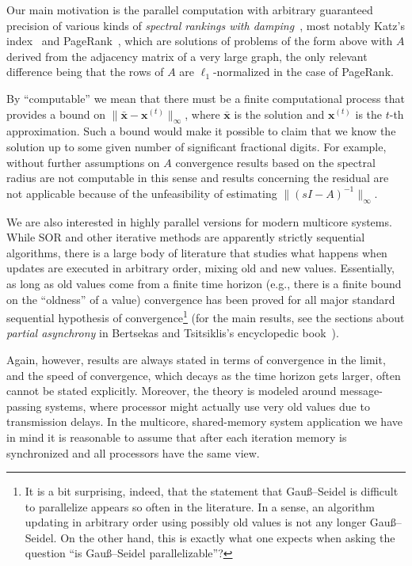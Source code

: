 \documentclass{article}
\newcommand{\Gauss}{Gau\ss}
\newcommand{\1}{\mathbf 1}
\begin{document}
Our main motivation is the parallel computation with arbitrary guaranteed
precision of various kinds of \emph{spectral rankings with
damping}~\cite{VigSR}, most notably Katz's index~\cite{KatNSIDSA} and
PageRank~\cite{PBMPCR}, which are solutions of problems of the form above with
$A$ derived from the adjacency matrix of a very large graph, the only relevant
difference being that the rows of $A$ are $\ell_1$-normalized in the case of PageRank.

By ``computable'' we mean that there must be a finite computational process that
provides a bound on $\bigl\|\bar{\bm x}-\bm x^{(t)}\bigr\|_\infty$,
where $\bar{\bm x}$ is the solution and $\bm x^{(t)}$ is the $t$-th
approximation. Such a bound would make it possible to claim that we
know the solution up to some given number of significant fractional digits. For
example, without further assumptions on $A$ convergence results based on the
spectral radius are not computable in this sense and results concerning the
residual are not applicable because of the unfeasibility of estimating
$\bigl\|(sI-A)^{-1}\bigr\|_\infty$. 

We are also interested in highly parallel versions for modern multicore systems.
While SOR and other iterative methods are apparently strictly sequential
algorithms, there is a large body of literature that studies what happens when
updates are executed in arbitrary order, mixing old and new values. Essentially,
as long as old values come from a finite time horizon (e.g., there is a finite
bound on the ``oldness'' of a value) convergence has been proved for all major
standard sequential hypothesis of convergence\footnote{It is a bit surprising,
indeed, that the statement that \Gauss--Seidel is difficult to parallelize
appears so often in the literature. In a sense, an algorithm updating in
arbitrary order using possibly old values is not any longer \Gauss--Seidel. On
the other hand, this is exactly what one expects when asking the question ``is
\Gauss--Seidel parallelizable''?} (for the main results, see the sections
about \emph{partial asynchrony} in Bertsekas and Tsitsiklis's encyclopedic book~\cite{BeTPDCNM}).

Again, however, results are always stated in terms of convergence in the
limit, and the speed of convergence, which decays as the time horizon gets
larger, often cannot be stated explicitly. Moreover, the theory is modeled
around message-passing systems, where processor might actually use very old
values due to transmission delays. In the multicore, shared-memory system
application we have in mind it is reasonable to assume that after each iteration
memory is synchronized and all processors have the same view.
\end{document}
